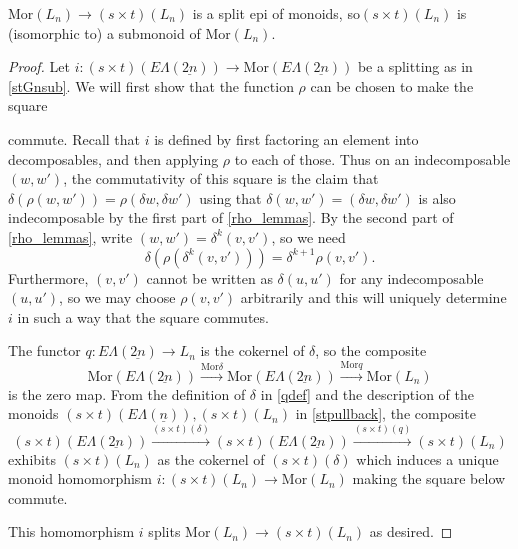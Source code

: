 \documentclass{amsbook} %
\newcommand{\ELn}{E\Lambda(\underline{n})}
\newcommand{\ELnn}{E\Lambda(\underline{2n})}
\numberwithin{section}{chapter}
\begin{document}
\begin{prop} \label{stZsub} $\mathrm{Mor}(L_n) \to (s \times t)(L_n)$ is a split epi of monoids, so$(s \times t)(L_n)$ is (isomorphic to) a submonoid of $\mathrm{Mor}(L_n)$.
\end{prop}
\begin{proof}
Let $i:(s \times t)(\ELnn) \to \mathrm{Mor}(\ELnn)$ be a splitting as in \cref{stGnsub}. We will first show that the function $\rho$ can be chosen to make the square
\begin{center}
\end{center}
commute. Recall that $i$ is defined by first factoring an element into decomposables, and then applying $\rho$ to each of those. Thus on an indecomposable $(w,w')$, the commutativity of this square is the claim that $\delta(\rho(w,w')) = \rho(\delta w, \delta w')$ using that $\delta(w,w') = (\delta w, \delta w')$ is also indecomposable by the first part of \cref{rho_lemmas}. By the second part of \cref{rho_lemmas}, write $(w,w') = \delta^k(v,v')$, so we need
\[
\delta(\rho(\delta^k(v,v'))) = \delta^{k+1}\rho(v,v').
\]
Furthermore, $(v,v')$ cannot be written as $\delta(u,u')$ for any indecomposable $(u,u')$, so we may choose $\rho(v,v')$ arbitrarily and this will uniquely determine $i$ in such a way that the square commutes. 

The functor $q:\ELnn \to L_n$ is the cokernel of $\delta$, so the composite
\[
\mathrm{Mor}(\ELnn) \stackrel{\mathrm{Mor}\delta}{\longrightarrow} \mathrm{Mor}(\ELnn) \stackrel{\mathrm{Mor}q}{\longrightarrow} \mathrm{Mor}(L_n)
\]
is the zero map. From the definition of $\delta$ in \cref{qdef} and the description of the monoids $(s \times t)(\ELn), (s \times t)(L_n)$ in \cref{stpullback}, the composite
\[
(s \times t)(\ELnn) \stackrel{(s \times t)(\delta)}{\longrightarrow}  (s \times t)(\ELnn) \stackrel{(s \times t)(q)}{\longrightarrow} (s \times t)(L_n)
\]
exhibits $(s \times t)(L_n)$ as the cokernel of $(s \times t)(\delta)$ which induces a unique monoid homomorphism $i: (s \times t)(L_n) \to \mathrm{Mor}(L_n)$ making the square below commute.
\begin{center}
\end{center}
This homomorphism $i$ splits $\mathrm{Mor}(L_n) \to (s \times t)(L_n)$ as desired.


\end{proof}
\end{document}
